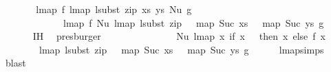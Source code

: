 \begin{isabellebody}
\isanewline
\ \ \ \isamarkupfalse%
\isanewline
\isanewline
\isanewline
\ \ \isamarkupfalse%
\ {\isachardoublequoteopen}lmap\ f\ {\isacharparenleft}{\kern0pt}lmap\ {\isacharparenleft}{\kern0pt}lsubst\ {\isacharparenleft}{\kern0pt}zip\ xs\ ys{\isacharparenright}{\kern0pt}{\isacharparenright}{\kern0pt}\ {\isacharparenleft}{\kern0pt}Nu\ g{\isacharparenright}{\kern0pt}{\isacharparenright}{\kern0pt}\ {\isacharequal}{\kern0pt}\isanewline
\ \ \ \ \ \ \ \ \ \ \ \ \ lmap\ f\ {\isacharparenleft}{\kern0pt}Nu\ {\isacharparenleft}{\kern0pt}lmap\ {\isacharparenleft}{\kern0pt}lsubst\ {\isacharparenleft}{\kern0pt}zip\ {\isacharparenleft}{\kern0pt}{}\ {\isacharhash}{\kern0pt}\ map\ Suc\ xs{\isacharparenright}{\kern0pt}\ {\isacharparenleft}{\kern0pt}{}\ {\isacharhash}{\kern0pt}\ map\ Suc\ ys{\isacharparenright}{\kern0pt}{\isacharparenright}{\kern0pt}{\isacharparenright}{\kern0pt}\ g{\isacharparenright}{\kern0pt}{\isacharparenright}{\kern0pt}{\isachardoublequoteclose}\isanewline
\ \ \ \ \ \isamarkupfalse%
\ IH{}\ \isamarkupfalse%
\ presburger\isanewline
\ \ \isamarkupfalse%
\ \isamarkupfalse%
\ {\isachardoublequoteopen}{\isachardot}{\kern0pt}{\isachardot}{\kern0pt}{\isachardot}{\kern0pt}\ {\isacharequal}{\kern0pt}\isanewline
\ \ \ \ \ \ \ \ Nu\ {\isacharparenleft}{\kern0pt}lmap\ {\isacharparenleft}{\kern0pt}{\isasymlambda}x{\isachardot}{\kern0pt}\ if\ x\ {\isacharequal}{\kern0pt}\ {}\ then\ x\ else\ {\isacharparenleft}{\kern0pt}f\ {\isacharparenleft}{\kern0pt}x\ {\isacharminus}{\kern0pt}\ {}{\isacharparenright}{\kern0pt}\ {\isacharplus}{\kern0pt}\ {}{\isacharparenright}{\kern0pt}{\isacharparenright}{\kern0pt}\isanewline
\ \ \ \ \ \ \ \ {\isacharparenleft}{\kern0pt}lmap\ {\isacharparenleft}{\kern0pt}lsubst\ {\isacharparenleft}{\kern0pt}zip\ {\isacharparenleft}{\kern0pt}{}\ {\isacharhash}{\kern0pt}\ map\ Suc\ xs{\isacharparenright}{\kern0pt}\ {\isacharparenleft}{\kern0pt}{}\ {\isacharhash}{\kern0pt}\ map\ Suc\ ys{\isacharparenright}{\kern0pt}{\isacharparenright}{\kern0pt}{\isacharparenright}{\kern0pt}\ g{\isacharparenright}{\kern0pt}{\isacharparenright}{\kern0pt}{\isachardoublequoteclose}\isanewline
\ \ \ \ \isamarkupfalse%
\ lmap{\isachardot}{\kern0pt}simps{\isacharparenleft}{\kern0pt}{}{\isacharparenright}{\kern0pt}\ \isamarkupfalse%
\ blast\isanewline
\ \ \isamarkupfalse%
\ \isamarkupfalse%

\end{isabellebody}
